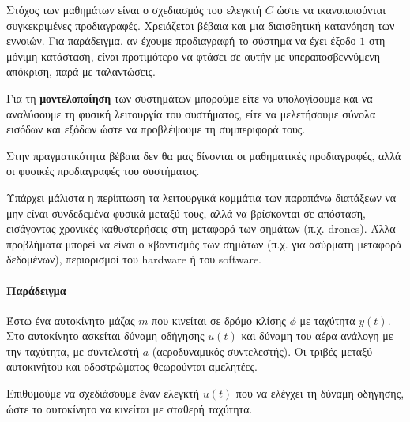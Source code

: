 \documentclass[11pt,a4paper,notitlepage,fleqn]{article}
\begin{document}
Στόχος των μαθημάτων είναι ο σχεδιασμός του ελεγκτή \( C \) ώστε να ικανοποιούνται
συγκεκριμένες προδιαγραφές. Χρειάζεται βέβαια και μια διαισθητική κατανόηση των εννοιών.
Για παράδειγμα, αν έχουμε προδιαγραφή το σύστημα να έχει έξοδο \( 1 \) στη μόνιμη κατάσταση,
είναι προτιμότερο να φτάσει σε αυτήν με υπεραποσβεννύμενη απόκριση, παρά με ταλαντώσεις.


Για τη \textbf{μοντελοποίηση} των συστημάτων μπορούμε είτε να υπολογίσουμε και να
αναλύσουμε τη φυσική λειτουργία του συστήματος, είτε να μελετήσουμε σύνολα εισόδων και
εξόδων ώστε να προβλέψουμε τη συμπεριφορά τους.

Στην πραγματικότητα βέβαια δεν θα μας δίνονται οι μαθηματικές προδιαγραφές, αλλά οι
φυσικές προδιαγραφές του συστήματος.

Υπάρχει μάλιστα η περίπτωση τα λειτουργικά κομμάτια των παραπάνω διατάξεων να μην
είναι συνδεδεμένα φυσικά μεταξύ τους, αλλά να βρίσκονται σε απόσταση, εισάγοντας
χρονικές καθυστερήσεις στη μεταφορά των σημάτων (π.χ. drones). Άλλα προβλήματα μπορεί
να είναι ο κβαντισμός των σημάτων (π.χ. για ασύρματη μεταφορά δεδομένων), περιορισμοί του
hardware ή του software.

\paragraph{Παράδειγμα}
Έστω ένα αυτοκίνητο μάζας \( m \) που κινείται σε δρόμο κλίσης \( \phi \) με ταχύτητα
\( y(t) \). Στο αυτοκίνητο ασκείται δύναμη οδήγησης \( u(t) \) και δύναμη του αέρα ανάλογη
με την ταχύτητα, με συντελεστή \( a \) (αεροδυναμικός συντελεστής).
Οι τριβές μεταξύ αυτοκινήτου και οδοστρώματος θεωρούνται αμελητέες.

Επιθυμούμε να σχεδιάσουμε έναν ελεγκτή \( u(t) \) που να ελέγχει τη δύναμη οδήγησης, ώστε
το αυτοκίνητο να κινείται με σταθερή ταχύτητα.
\end{document}
